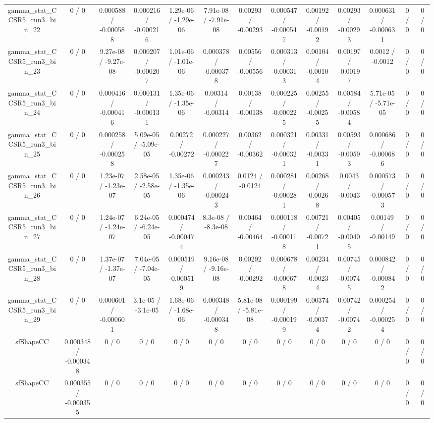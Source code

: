 \documentclass[10pt]{article}
\begin{document}
\begin{table}[htbp]
\begin{center}
\begin{tabular}{|c|c|c|c|c|c|c|c|c|c|c|c|c|}
  gamma_stat_CCSR5_run3_bin_22 & 0 / 0 & 0.000588 / -0.000588 & 0.000216 / -0.000216 & 1.29e-06 / -1.29e-06 & 7.91e-08 / -7.91e-08 & 0.00293 / -0.00293 & 0.000547 / -0.000547 & 0.00192 / -0.00192 & 0.00293 / -0.00293 & 0.000631 / -0.000631 & 0 / 0 & 0 / 0 \\ 
  gamma_stat_CCSR5_run3_bin_23 & 0 / 0 & 9.27e-08 / -9.27e-08 & 0.000207 / -0.000207 & 1.01e-06 / -1.01e-06 & 0.000378 / -0.000378 & 0.00556 / -0.00556 & 0.000313 / -0.000313 & 0.00104 / -0.00104 & 0.00197 / -0.00197 & 0.0012 / -0.0012 & 0 / 0 & 0 / 0 \\ 
  gamma_stat_CCSR5_run3_bin_24 & 0 / 0 & 0.000416 / -0.000416 & 0.000131 / -0.000131 & 1.35e-06 / -1.35e-06 & 0.00314 / -0.00314 & 0.00138 / -0.00138 & 0.000225 / -0.000225 & 0.00255 / -0.00255 & 0.00584 / -0.00584 & 5.71e-05 / -5.71e-05 & 0 / 0 & 0 / 0 \\ 
  gamma_stat_CCSR5_run3_bin_25 & 0 / 0 & 0.000258 / -0.000258 & 5.09e-05 / -5.09e-05 & 0.00272 / -0.00272 & 0.000227 / -0.000227 & 0.00362 / -0.00362 & 0.000321 / -0.000321 & 0.00331 / -0.00331 & 0.00593 / -0.00593 & 0.000686 / -0.000686 & 0 / 0 & 0 / 0 \\ 
  gamma_stat_CCSR5_run3_bin_26 & 0 / 0 & 1.23e-07 / -1.23e-07 & 2.58e-05 / -2.58e-05 & 1.35e-06 / -1.35e-06 & 0.000243 / -0.000243 & 0.0124 / -0.0124 & 0.000281 / -0.000281 & 0.00268 / -0.00268 & 0.0043 / -0.0043 & 0.000573 / -0.000573 & 0 / 0 & 0 / 0 \\ 
  gamma_stat_CCSR5_run3_bin_27 & 0 / 0 & 1.24e-07 / -1.24e-07 & 6.24e-05 / -6.24e-05 & 0.000474 / -0.000474 & 8.3e-08 / -8.3e-08 & 0.00464 / -0.00464 & 0.000118 / -0.000118 & 0.00721 / -0.00721 & 0.00405 / -0.00405 & 0.00149 / -0.00149 & 0 / 0 & 0 / 0 \\ 
  gamma_stat_CCSR5_run3_bin_28 & 0 / 0 & 1.37e-07 / -1.37e-07 & 7.04e-05 / -7.04e-05 & 0.000519 / -0.000519 & 9.16e-08 / -9.16e-08 & 0.00292 / -0.00292 & 0.000678 / -0.000678 & 0.00234 / -0.00234 & 0.00745 / -0.00745 & 0.000842 / -0.000842 & 0 / 0 & 0 / 0 \\ 
  gamma_stat_CCSR5_run3_bin_29 & 0 / 0 & 0.000601 / -0.000601 & 3.1e-05 / -3.1e-05 & 1.68e-06 / -1.68e-06 & 0.000348 / -0.000348 & 5.81e-08 / -5.81e-08 & 0.000199 / -0.000199 & 0.00374 / -0.00374 & 0.00742 / -0.00742 & 0.000254 / -0.000254 & 0 / 0 & 0 / 0 \\ 
  sfShapeCC & 0.000348 / -0.000348 & 0 / 0 & 0 / 0 & 0 / 0 & 0 / 0 & 0 / 0 & 0 / 0 & 0 / 0 & 0 / 0 & 0 / 0 & 0 / 0 & 0 / 0 \\ 
  sfShapeCC & 0.000355 / -0.000355 & 0 / 0 & 0 / 0 & 0 / 0 & 0 / 0 & 0 / 0 & 0 / 0 & 0 / 0 & 0 / 0 & 0 / 0 & 0 / 0 & 0 / 0 \\ 

\end{tabular}
\end{center}
\end{table}
\end{document}
